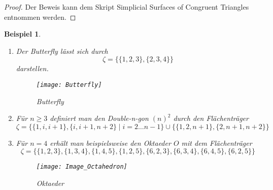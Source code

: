 \documentclass[12pt,titlepage,twoside,cleardoublepage]{article}
\theoremstyle{nummermitklammern}
\newtheorem{bsp}[temp]{Beispiel}
\newtheorem{bsp}[zahl]{Beispiel}
\numberwithin{equation}{section}
\begin{document}
\begin{proof}
Der Beweis kann dem Skript Simplicial Surfaces of Congruent Triangles entnommen werden.
\begin{comment}
Man muss nachweisen, dass $S(\xi)$ die Axiome in \Cref{def1} erfüllt.
\begin{itemize}
\item Das es zu jeder Kante genau zwei Ecken gibt, die inzident zu dieser sind, ist klar, denn zu einer 2-elementigen gibt es genau zwei 1-elementigen Teilmengen.
\item Da es zu einer 3-elementigen Menge genau drei 1-elementigen Teilmengen gibt, gibt es in $\mathcal{S}$ zu jeder Fläche genau drei Knoten. 
\item Eine Kante ist durch die Mengeninklusion inzident zu mindestens einen Fläche und durch obige Definition eines Flächenträgers erhält man, dass eine Kante zu höchstens zwei Flächen inzident ist. 
\item Die Anordnung der Flächen einer Ecke in einem Schirm wird in Definition 4.3 verlangt und ist somit klarerweise erfüllt.
\end{itemize}
\end{comment}
\end{proof}
\begin{bsp} \label{bspO}
\begin{enumerate}
Der Flächenträger 
\[
\zeta=\{\{1,2,3\},\{1,3,4\},\{1,2,4\},\{2,3,4\}\}
\]
bildet eine getragene simpliziale Fläche, die zum Tetraeder isomorph ist.
\item Der Butterfly lässt sich durch 
\[
\zeta =\{\{1,2,3\},\{2,3,4\}\}
\] darstellen.
\begin{figure}[H]
\begin{center}
\texttt{[image: Butterfly]}
\end{center}
\caption{Butterfly}
\end{figure}
\item 

Für $n\geq 3$ definiert man den Double-n-gon $(n)^2$ durch den Flächenträger  
\[
\zeta=\{\{1,i,i+1\},\{i,i+1,n+2\}\mid i=2\ldots n-1\}\cup \{\{1,2,n+1\},\{2,n+1,n+2\}\}
\]  
\item
Für $n=4$ erhält man beispielsweise den Oktaeder $O$ mit dem  Flächenträger
\[
\zeta=\{\{1,2,3\},\{1,3,4\},\{1,4,5\},\{1,2,5\},\{6,2,3\},\{6,3,4\},\{6,4,5\},\{6,2,5\}\}
\]
\begin{figure}[H]
\begin{center}
\texttt{[image: Image\_Octahedron]}
\end{center}
\caption{Oktaeder}
\end{figure} 
\end{enumerate}
\end{bsp}
\end{document}
